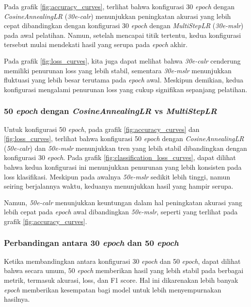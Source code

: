 Pada grafik \ref{fig:accuracy_curves}, terlihat bahwa konfigurasi 30 \emph{epoch} dengan \emph{CosineAnnealingLR} (\emph{30e-calr}) menunjukkan peningkatan akurasi yang lebih cepat dibandingkan dengan konfigurasi 30 \emph{epoch} dengan \emph{MultiStepLR} (\emph{30e-mslr}) pada awal pelatihan. Namun, setelah mencapai titik tertentu, kedua konfigurasi tersebut mulai mendekati hasil yang serupa pada \emph{epoch} akhir. 

Pada grafik \ref{fig:loss_curves}, kita juga dapat melihat bahwa \emph{30e-calr} cenderung memiliki penurunan loss yang lebih stabil, sementara \emph{30e-mslr} menunjukkan fluktuasi yang lebih besar terutama pada \emph{epoch} awal. Meskipun demikian, kedua konfigurasi mengalami penurunan loss yang cukup signifikan sepanjang pelatihan.

\subsubsection{50 \emph{epoch} dengan \emph{CosineAnnealingLR} vs \emph{MultiStepLR}}

Untuk konfigurasi 50 \emph{epoch}, pada grafik \ref{fig:accuracy_curves} dan \ref{fig:loss_curves}, terlihat bahwa konfigurasi 50 \emph{epoch} dengan \emph{CosineAnnealingLR} (\emph{50e-calr}) dan \emph{50e-mslr} menunjukkan tren yang lebih stabil dibandingkan dengan konfigurasi 30 \emph{epoch}. Pada grafik \ref{fig:classification_loss_curves}, dapat dilihat bahwa kedua konfigurasi ini menunjukkan penurunan yang lebih konsisten pada loss klasifikasi. Meskipun pada awalnya \emph{50e-mslr} sedikit lebih tinggi, namun seiring berjalannya waktu, keduanya menunjukkan hasil yang hampir serupa.

Namun, \emph{50e-calr} menunjukkan keuntungan dalam hal peningkatan akurasi yang lebih cepat pada \emph{epoch} awal dibandingkan \emph{50e-mslr}, seperti yang terlihat pada grafik \ref{fig:accuracy_curves}.

\subsubsection{Perbandingan antara 30 \emph{epoch} dan 50 \emph{epoch}}

Ketika membandingkan antara konfigurasi 30 \emph{epoch} dan 50 \emph{epoch}, dapat dilihat bahwa secara umum, 50 \emph{epoch} memberikan hasil yang lebih stabil pada berbagai metrik, termasuk akurasi, loss, dan F1 score. Hal ini dikarenakan lebih banyak \emph{epoch} memberikan kesempatan bagi model untuk lebih menyempurnakan hasilnya.

